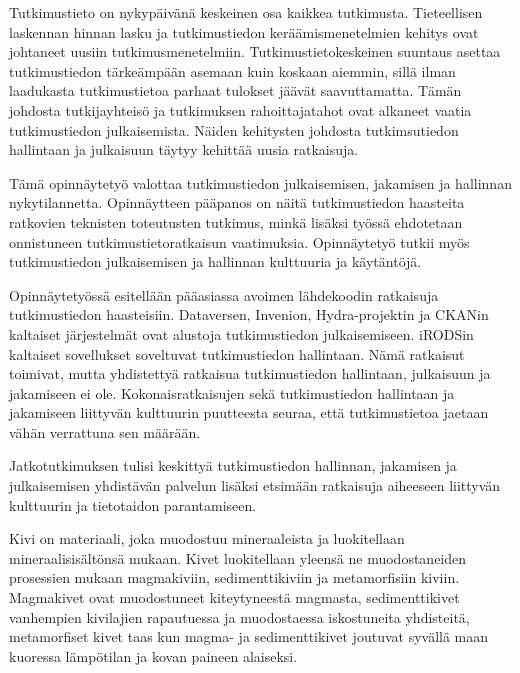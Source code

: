 Tutkimustieto on nykyp{\"a}iv{\"a}n{\"a} keskeinen osa kaikkea tutkimusta. Tieteellisen
laskennan hinnan lasku ja tutkimustiedon ker{\"a}{\"a}mismenetelmien kehitys ovat johtaneet
uusiin tutkimusmenetelmiin. Tutkimustietokeskeinen suuntaus asettaa
tutkimustiedon t{\"a}rke{\"a}mp{\"a}{\"a}n asemaan kuin koskaan aiemmin, sill{\"a} ilman
laadukasta tutkimustietoa parhaat tulokset j{\"a}{\"a}v{\"a}t saavuttamatta.
T{\"a}m{\"a}n johdosta tutkijayhteis{\"o} ja tutkimuksen rahoittajatahot ovat
alkaneet vaatia tutkimustiedon julkaisemista. N{\"a}iden kehitysten johdosta
tutkimsutiedon hallintaan ja julkaisuun t{\"a}ytyy kehitt{\"a}{\"a} uusia ratkaisuja.

T{\"a}m{\"a} opinn{\"a}ytety{\"o} valottaa tutkimustiedon julkaisemisen, jakamisen ja
hallinnan nykytilannetta. Opinn{\"a}ytteen p{\"a}{\"a}panos on n{\"a}it{\"a} tutkimustiedon
haasteita ratkovien teknisten toteutusten tutkimus, mink{\"a} lis{\"a}ksi ty{\"o}ss{\"a}
ehdotetaan onnistuneen tutkimustietoratkaisun vaatimuksia. Opinn{\"a}ytety{\"o}
tutkii my{\"o}s tutkimustiedon julkaisemisen ja hallinnan kulttuuria ja
k{\"a}yt{\"a}nt{\"o}j{\"a}.

Opinn{\"a}ytety{\"o}ss{\"a} esitell{\"a}{\"a}n p{\"a}{\"a}asiassa avoimen l{\"a}hdekoodin ratkaisuja
tutkimustiedon haasteisiin. Dataversen, Invenion, Hydra-projektin
ja CKANin kaltaiset j{\"a}rjestelm{\"a}t ovat alustoja tutkimustiedon julkaisemiseen.
iRODSin kaltaiset sovellukset soveltuvat tutkimustiedon hallintaan. N{\"a}m{\"a}
ratkaisut toimivat, mutta yhdistetty{\"a} ratkaisua tutkimustiedon hallintaan, julkaisuun
ja jakamiseen ei ole. Kokonaisratkaisujen sek{\"a} tutkimustiedon
hallintaan ja jakamiseen liittyv{\"a}n kulttuurin puutteesta seuraa, ett{\"a}
tutkimustietoa jaetaan v{\"a}h{\"a}n verrattuna sen m{\"a}{\"a}r{\"a}{\"a}n.

Jatkotutkimuksen tulisi keskitty{\"a} tutkimustiedon hallinnan, jakamisen ja julkaisemisen
yhdist{\"a}v{\"a}n palvelun lis{\"a}ksi etsim{\"a}{\"a}n ratkaisuja aiheeseen liittyv{\"a}n kulttuurin ja
tietotaidon parantamiseen.

\iffalse
Kivi on materiaali, joka muodostuu mineraaleista ja luokitellaan
mineraalisis{\"a}lt{\"o}ns{\"a} mukaan. Kivet luokitellaan yleens{\"a} ne muodostaneiden
prosessien mukaan magmakiviin, sedimenttikiviin ja metamorfisiin kiviin.
Magmakivet ovat muodostuneet kiteytyneest{\"a} magmasta, sedimenttikivet vanhempien
kivilajien rapautuessa ja muodostaessa iskostuneita yhdisteit{\"a}, metamorfiset
kivet taas kun magma- ja sedimenttikivet joutuvat syv{\"a}ll{\"a} maan kuoressa
l{\"a}mp{\"o}tilan ja kovan paineen alaiseksi.

